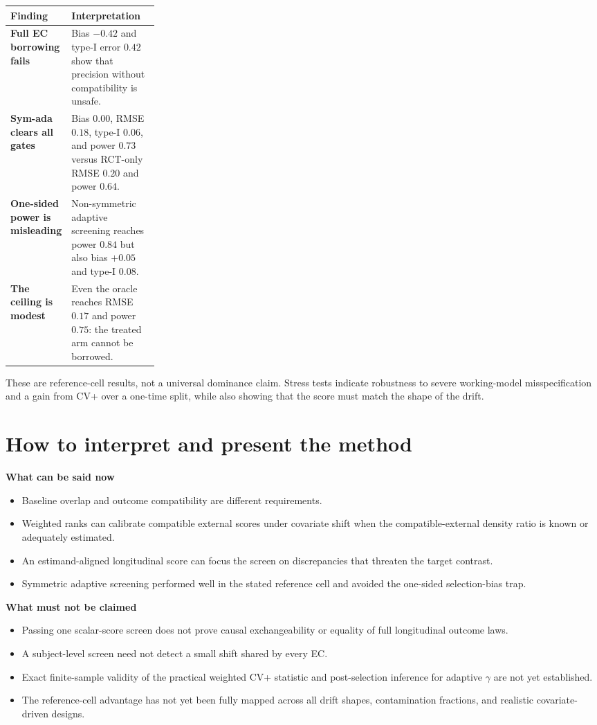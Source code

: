 \documentclass[10pt]{article}
\begin{document}
\begin{center}
\begin{tabularx}{0.96\linewidth}{>{\bfseries}p{0.25\linewidth}X}
\toprule
Finding & Interpretation \\
\midrule
Full EC borrowing fails & Bias $-0.42$ and type-I error $0.42$ show that precision without compatibility is unsafe.\\
Sym-ada clears all gates & Bias $0.00$, RMSE $0.18$, type-I $0.06$, and power $0.73$ versus RCT-only RMSE $0.20$ and power $0.64$.\\
One-sided power is misleading & Non-symmetric adaptive screening reaches power $0.84$ but also bias $+0.05$ and type-I $0.08$.\\
The ceiling is modest & Even the oracle reaches RMSE $0.17$ and power $0.75$: the treated arm cannot be borrowed.\\
\bottomrule
\end{tabularx}
\end{center}

These are reference-cell results, not a universal dominance claim. Stress tests indicate robustness to severe working-model misspecification and a gain from CV+ over a one-time split, while also showing that the score must match the shape of the drift.

\clearpage
\section{How to interpret and present the method}

\textbf{What can be said now}
\begin{itemize}
\item Baseline overlap and outcome compatibility are different requirements.
\item Weighted ranks can calibrate compatible external scores under covariate shift when the compatible-external density ratio is known or adequately estimated.
\item An estimand-aligned longitudinal score can focus the screen on discrepancies that threaten the target contrast.
\item Symmetric adaptive screening performed well in the stated reference cell and avoided the one-sided selection-bias trap.
\end{itemize}

\textbf{What must not be claimed}
\begin{itemize}
\item Passing one scalar-score screen does not prove causal exchangeability or equality of full longitudinal outcome laws.
\item A subject-level screen need not detect a small shift shared by every EC.
\item Exact finite-sample validity of the practical weighted CV+ statistic and post-selection inference for adaptive $\gamma$ are not yet established.
\item The reference-cell advantage has not yet been fully mapped across all drift shapes, contamination fractions, and realistic covariate-driven designs.
\end{itemize}
\end{document}
